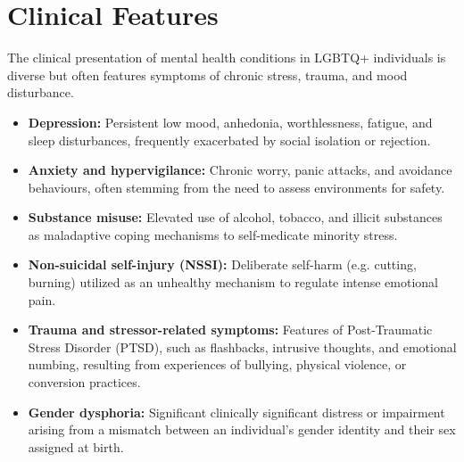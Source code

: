 \section*{Clinical Features}
The clinical presentation of mental health conditions in LGBTQ+ individuals is diverse but often features symptoms of chronic stress, trauma, and mood disturbance.
\begin{itemize}
    \item \textbf{Depression:} Persistent low mood, anhedonia, worthlessness, fatigue, and sleep disturbances, frequently exacerbated by social isolation or rejection.
    \item \textbf{Anxiety and hypervigilance:} Chronic worry, panic attacks, and avoidance behaviours, often stemming from the need to assess environments for safety.
    \item \textbf{Substance misuse:} Elevated use of alcohol, tobacco, and illicit substances as maladaptive coping mechanisms to self-medicate minority stress.
    \item \textbf{Non-suicidal self-injury (NSSI):} Deliberate self-harm (e.g. cutting, burning) utilized as an unhealthy mechanism to regulate intense emotional pain.
    \item \textbf{Trauma and stressor-related symptoms:} Features of Post-Traumatic Stress Disorder (PTSD), such as flashbacks, intrusive thoughts, and emotional numbing, resulting from experiences of bullying, physical violence, or conversion practices.
    \item \textbf{Gender dysphoria:} Significant clinically significant distress or impairment arising from a mismatch between an individual's gender identity and their sex assigned at birth.
\end{itemize}

